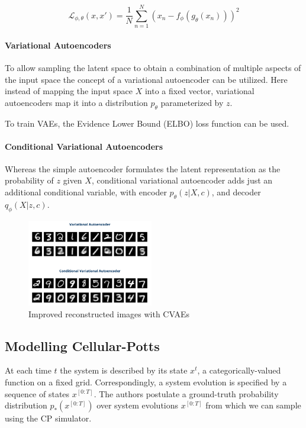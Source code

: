 \documentclass[a4paper,10pt,twocolumn]{article}
\begin{document}
            \begin{equation}
                \mathcal{L}_{\phi, \theta}({x}, {x'}) = \frac{1}{N} \sum_{n=1}^{N} {({x_n} - f_{\phi} (g_{\theta} ({x_n})))}^2
                \label{eq:lossfunc}
            \end{equation}
            
            \paragraph{Variational Autoencoders}
            To allow sampling the latent space to obtain a combination of multiple aspects of the input space
            the concept of a variational autoencoder can be utilized.
            Here instead of mapping the input space $X$ into a fixed vector, variational autoencoders
            map it into a distribution $p_\theta$ parameterized by $z$\cite{rocca_vaes}.
            
            To train VAEs, the Evidence Lower Bound (ELBO) loss function can be used.

            \paragraph{Conditional Variational Autoencoders}
            Whereas the simple autoencoder formulates the latent representation as the probability of
            $z$ given $X$, conditional variational autoencoder adds just an additional conditional variable, 
            with encoder $p_\theta (z | X, c)$, and decoder $q_\phi (X | z, c)$\cite{cvaes}.

            \begin{figure}[H]
                \centering
                \includegraphics[width=0.49\textwidth]{../images/vae_vs_cvae.png}
                \caption{Improved reconstructed images with CVAEs}\label{fig:vae_vs_cvae}
            \end{figure}


        \subsection{Modelling Cellular-Potts}
            At each time $t$ the system is described by its state $x^t$, a
            categorically-valued function on a fixed grid. 
            Correspondingly, a system evolution is specified by a sequence of states $x^{[0:T]}$.
            The authors postulate a ground-truth probability distribution $p_*(x^{[0:T]})$\cite{minartz_cpm} 
            over system evolutions $x^{[0:T]}$ from which we can sample using the CP simulator. 
            
\end{document}

